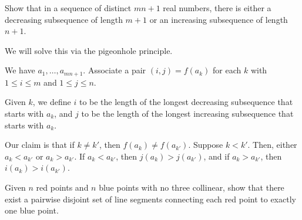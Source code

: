 \documentclass[10pt]{mypackage}
\begin{document}
\begin{problem}
  Show that in a sequence of distinct $mn + 1$ real numbers, there is either a decreasing subsequence of length $m + 1$ or an increasing subsequence of length $n + 1$.
\end{problem}
%
\begin{solution}
  We will solve this via the pigeonhole principle.\newline

  We have $a_1,\dots,a_{mn + 1}$. Associate a pair $\left( i,j \right) = f\left(a_{k}\right)$ for each $k$ with $1 \leq i \leq m$ and $1 \leq j \leq n$.\newline

  Given $k$, we define $i$ to be the length of the longest decreasing subsequence that starts with $a_k$, and $j$ to be the length of the longest increasing subsequence that starts with $a_k$.\newline

  Our claim is that if $k \neq k'$, then $f\left( a_k \right)\neq f\left( a_{k'} \right)$. Suppose $k < k'$. Then, either $a_{k}  < a_{k'}$ or $a_k > a_{k'}$. If $a_k < a_{k'}$, then $j\left(a_k\right) > j\left( a_{k'} \right)$, and if $a_k > a_{k'}$, then $i\left( a_k \right) > i\left( a_{k'} \right)$.
\end{solution}
\begin{problem}
  Given $n$ red points and $n$ blue points with no three collinear, show that there exist a pairwise disjoint set of line segments connecting each red point to exactly one blue point.
\end{problem}
\end{document}
